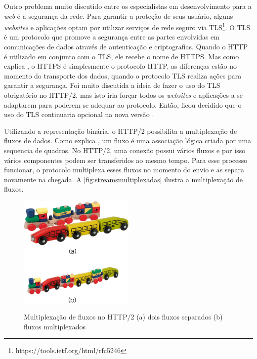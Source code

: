 Outro problema muito discutido entre os especialistas em desenvolvimento para a \textit{web} é a segurança da rede. Para garantir a proteção de seus usuário, alguns \textit{websites} e aplicações optam por utilizar serviços de rede seguro via TLS\footnote{https://tools.ietf.org/html/rfc5246}. O TLS é um protocolo que promove a segurança entre as partes envolvidas em comunicações de dados através de autenticação e criptografias. Quando o HTTP é utilizado em conjunto com o TLS, ele recebe o nome de HTTPS. Mas como explica , o HTTPS é simplesmente o protocolo HTTP, as diferenças estão no momento do transporte dos dados, quando o protocolo TLS realiza ações para garantir a segurança. Foi muito discutida a ideia de fazer o uso do TLS obrigatório no HTTP/2, mas isto iria forçar todos os \textit{websites} e aplicações a se adaptarem para poderem se adequar ao protocolo. Então, ficou decidido que o uso do TLS continuaria opcional na nova versão \cite{Tanenbaum}.

Utilizando a representação binária, o HTTP/2 possibilita a multiplexação de fluxos de dados. Como explica , um fluxo é uma associação lógica criada por uma sequencia de quadros. No HTTP/2, uma conexão possui vários fluxos e por isso vários componentes podem ser transferidos ao mesmo tempo. Para esse processo funcionar, o protocolo multiplexa esses fluxos no momento do envio e as separa novamente na chegada. A \autoref{fig:streamsmultiplexadas} ilustra a multiplexação de fluxos.

\begin{figure}[!htb]
    \centering
    \caption{Multiplexação de fluxos no HTTP/2 (a) dois fluxos separados (b) fluxos multiplexados}
    \includegraphics[width=0.5\textwidth]{./04-figuras/fund-teorica/multiplexed_streams}
    \label{fig:streamsmultiplexadas}
\end{figure}

